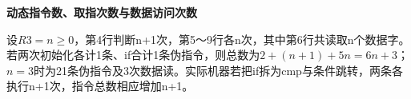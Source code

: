 {\color{ink}\bfseries 动态指令数、取指次数与数据访问次数}\par\vspace{1bp}设\(R3=\allowbreak{}n\ge 0\)，第4行判断n+\allowbreak{}1次，第5～9行各n次，其中第6行共读取n个数据字。若两次初始化各计1条、if合计1条伪指令，则总数为\(2+\allowbreak{}(n+\allowbreak{}1)+\allowbreak{}5n=\allowbreak{}6n+\allowbreak{}3\)；\(n=\allowbreak{}3\)时为21条伪指令及3次数据读。实际机器若把if拆为cmp与条件跳转，两条各执行n+\allowbreak{}1次，指令总数相应增加n+\allowbreak{}1。

